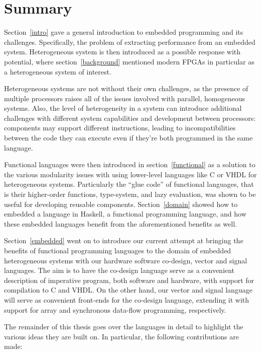 \documentclass[../paper.tex]{subfiles}
\begin{document}
\section{Summary}

Section~\ref{intro} gave a general introduction to embedded programming and its challenges. Specifically, the problem of extracting performance from an embedded system. Heterogeneous system is then introduced as a possible response with potential, where section~\ref{background} mentioned modern FPGAs in particular as a heterogeneous system of interest.

Heterogeneous systems are not without their own challenges, as the presence of multiple processors raises all of the issues involved with parallel, homogeneous systems. Also, the level of heterogeneity in a system can introduce additional challenges with different system capabilities and development between processors: components may support different instructions, leading to incompatibilities between the code they can execute even if they're both programmed in the same language.

Functional languages were then introduced in section~\ref{functional} as a solution to the various modularity issues with using lower-level languages like C or VHDL for heterogeneous systems. Particularly the ``glue code'' of functional languages, that is their higher-order functions, type-system, and lazy evaluation, was shown to be useful for developing reusable components. Section~\ref{domain} showed how to embedded a language in Haskell, a functional programming language, and how these embedded languages benefit from the aforementioned benefits as well.

Section~\ref{embedded} went on to introduce our current attempt at bringing the benefits of functional programming languages to the domain of embedded heterogeneous systems with our hardware software co-design, vector and signal languages. The aim is to have the co-design language serve as a convenient description of imperative program, both software and hardware, with support for compilation to C and VHDL. On the other hand, our vector and signal language will serve as convenient front-ends for the co-design language, extending it with support for array and synchronous data-flow programming, respectively.

The remainder of this thesis goes over the languages in detail to highlight the various ideas they are built on. In particular, the following contributions are made:
\end{document}

